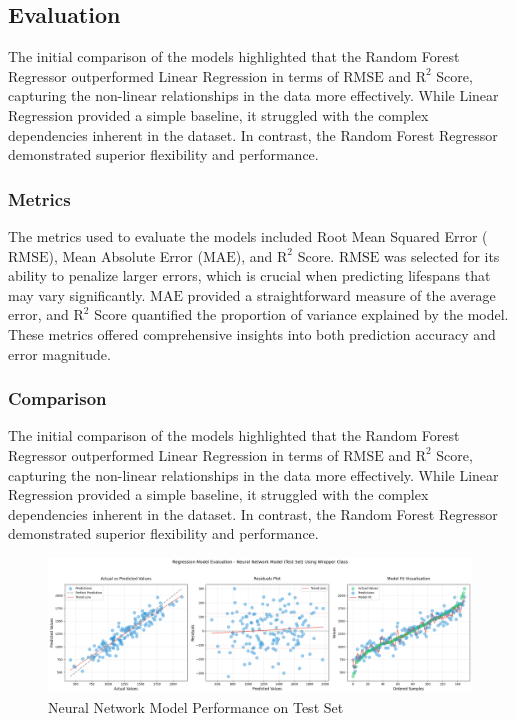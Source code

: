 \documentclass{article}
\begin{document}
\subsection{Evaluation}

The initial comparison of the models highlighted that the Random Forest Regressor outperformed Linear Regression in terms of $\text{RMSE}$ and $\text{R}^2$ Score, capturing the non-linear relationships in the data more effectively. While Linear Regression provided a simple baseline, it struggled with the complex dependencies inherent in the dataset. In contrast, the Random Forest Regressor demonstrated superior flexibility and performance.

\subsubsection{Metrics}

The metrics used to evaluate the models included Root Mean Squared Error ($\text{RMSE}$), Mean Absolute Error ($\text{MAE}$), and $\text{R}^2$ Score. $\text{RMSE}$ was selected for its ability to penalize larger errors, which is crucial when predicting lifespans that may vary significantly. $\text{MAE}$ provided a straightforward measure of the average error, and $\text{R}^2$ Score quantified the proportion of variance explained by the model. These metrics offered comprehensive insights into both prediction accuracy and error magnitude.

\subsubsection{Comparison}

The initial comparison of the models highlighted that the Random Forest Regressor outperformed Linear Regression in terms of $\text{RMSE}$ and $\text{R}^2$ Score, capturing the non-linear relationships in the data more effectively. While Linear Regression provided a simple baseline, it struggled with the complex dependencies inherent in the dataset. In contrast, the Random Forest Regressor demonstrated superior flexibility and performance.

\begin{figure}[htbp]
    \centering
    \includegraphics[width=1\textwidth]{./Images/NeuralNetworkModel-TestSet-1.png}
    \caption{Neural Network Model Performance on Test Set}
    \label{fig:neural_network_model_performance}
\end{figure}
\end{document}
